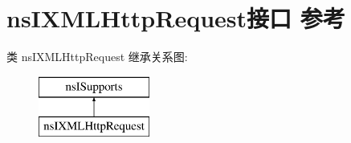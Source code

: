 \hypertarget{interfacens_i_x_m_l_http_request}{}\section{ns\+I\+X\+M\+L\+Http\+Request接口 参考}
\label{interfacens_i_x_m_l_http_request}
类 ns\+I\+X\+M\+L\+Http\+Request 继承关系图\+:\begin{figure}[H]
\begin{center}
\leavevmode
\includegraphics[height=2.000000cm]{interfacens_i_x_m_l_http_request}
\end{center}
\end{figure}
